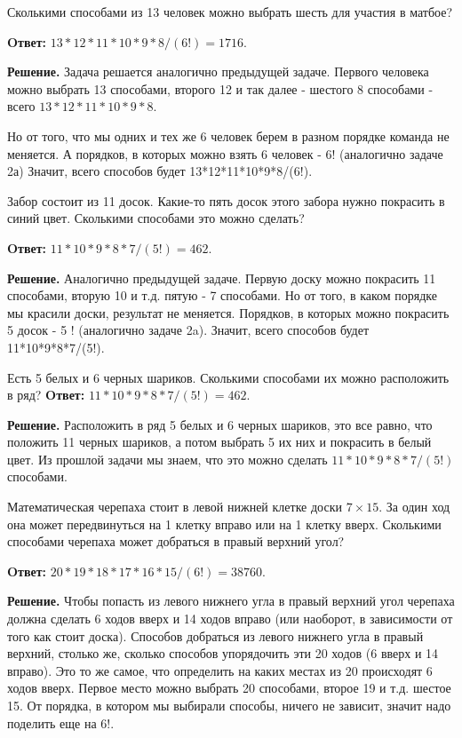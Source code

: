 Сколькими способами из 13 человек можно выбрать шесть для участия в матбое?

\textbf{Oтвет:} $13 * 12 * 11 * 10 * 9 * 8 /(6!)=1716$.

\textbf{Решение.}
Задача решается аналогично предыдущей задаче. Первого человека можно выбрать 13 способами, второго 12 и так далее - шестого 8 способами - всего $13 * 12 * 11 * 10 * 9 * 8$.

Но от того, что мы одних и тех же 6 человек берем в разном порядке команда не меняется. А порядков, в которых можно взять 6 человек - 6! (аналогично задаче 2а) Значит, всего способов будет 13*12*11*10*9*8/(6!).

Забор состоит из 11 досок. Какие-то пять досок этого забора нужно покрасить в синий цвет. Сколькими способами это можно сделать?

\textbf{Oтвет:} $11 * 10 * 9 * 8 * 7 /(5!)=462$.

\textbf{Решение.} 
Аналогично предыдущей задаче. Первую доску можно покрасить 11 способами, вторую 10 и т.д. пятую - 7 способами. Но от того, в каком порядке мы красили доски, результат не меняется. Порядков, в которых можно покрасить 5 досок - 5 ! (аналогично задаче 2a). Значит, всего способов будет 11*10*9*8*7/(5!).

Есть 5 белых и 6 черных шариков. Сколькими способами их можно расположить в ряд?
\textbf{Oтвет:} $11 * 10 * 9 * 8 * 7 /(5!)=462$.

\textbf{Решение.} 
Расположить в ряд 5 белых и 6 черных шариков, это все равно, что положить 11 черных шариков, а потом выбрать 5 их них и покрасить в белый цвет. Из прошлой задачи мы знаем, что это можно сделать $11 * 10 * 9 * 8 * 7 /(5!)$ способами.


Математическая черепаха стоит в левой нижней клетке доски $7 \times 15$. За один ход она может передвинуться на 1 клетку вправо или на 1 клетку вверх. Сколькими способами черепаха может добраться в правый верхний угол?

\textbf{Oтвет:} $20 * 19 * 18 * 17 * 16 * 15 /(6!)=38760$.

\textbf{Решение.} 
Чтобы попасть из левого нижнего угла в правый верхний угол черепаха должна сделать 6 ходов вверх и 14 ходов вправо (или наоборот, в зависимости от того как стоит доска). Способов добраться из левого нижнего угла в правый верхний, столько же, сколько способов упорядочить эти 20 ходов (6 вверх и 14 вправо). Это то же самое, что определить на каких местах из 20 происходят 6 ходов вверх. Первое место можно выбрать 20 способами, второе 19 и т.д. шестое 15. От порядка, в котором мы выбирали способы, ничего не зависит, значит надо поделить еще на 6!.

